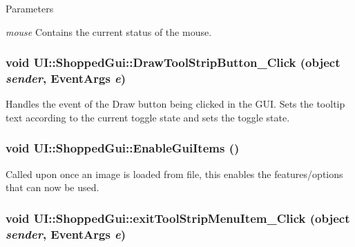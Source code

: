 \begin{DoxyParams}{Parameters}
\item[{\em mouse}]Contains the current status of the mouse. \end{DoxyParams}
\hypertarget{class_u_i_1_1_shopped_gui_af3350e3e7c086196264ad9443eb4f2ac}{
\subsubsection[{DrawToolStripButton\_\-Click}]{\setlength{\rightskip}{0pt plus 5cm}void UI::ShoppedGui::DrawToolStripButton\_\-Click (object {\em sender}, \/  EventArgs {\em e})}}
\label{class_u_i_1_1_shopped_gui_af3350e3e7c086196264ad9443eb4f2ac}
Handles the event of the Draw button being clicked in the GUI. Sets the tooltip text according to the current toggle state and sets the toggle state. \hypertarget{class_u_i_1_1_shopped_gui_a190bba777e57891c8042b86afbba83c6}{
\subsubsection[{EnableGuiItems}]{\setlength{\rightskip}{0pt plus 5cm}void UI::ShoppedGui::EnableGuiItems ()}}
\label{class_u_i_1_1_shopped_gui_a190bba777e57891c8042b86afbba83c6}
Called upon once an image is loaded from file, this enables the features/options that can now be used. \hypertarget{class_u_i_1_1_shopped_gui_a4c3239cc225d230bafb0cc53a9f49e2c}{
\subsubsection[{exitToolStripMenuItem\_\-Click}]{\setlength{\rightskip}{0pt plus 5cm}void UI::ShoppedGui::exitToolStripMenuItem\_\-Click (object {\em sender}, \/  EventArgs {\em e})}}
